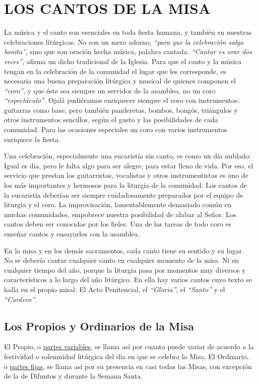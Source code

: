 \documentclass[letterpaper, 12pt]{book}
\begin{document}
    \chapter{LOS CANTOS DE LA MISA}
    La m\'usica y el canto son esenciales en toda fiesta humana, y tambi\'en en nuestras celebraciones lit\'urgicas. No son un mero adorno, \textit{``para que la celebraci\'on salga bonita''}, sino que son oraci\'on hecha m\'usica, palabra cantada. \textit{``Cantar es orar dos veces''}, afirma un dicho tradicional de la Iglesia. Para que el canto y la m\'usica tengan en la celebraci\'on de la comunidad el lugar que les corresponde, es necesaria una buena preparación lit\'urgica y musical de quienes componen el \textit{``coro''}, y que \'este sea siempre un servidor de la asamblea, no un coro \textit{``espect\'aculo''}. Ojal\'a pudi\'eramos enriquecer siempre el coro con instrumentos: guitarras como base, pero tambi\'en panderetas, bombos, bong\'os, tri\'angulos y otros instrumentos sencillos, seg\'un el gusto y las posibilidades de cada comunidad. Para las ocasiones especiales un coro con varios instrumentos enriquece la fiesta.\newline
    
    Una celebraci\'on, especialmente una eucarist\'ia sin canto, es como un d\'ia nublado: Igual es d\'ia, pero le falta algo para ser alegre, para estar lleno de vida. Por eso, el servicio que prestan los guitarristas, vocalistas y otros instrumentistas es uno de los m\'as importantes y hermosos para la liturgia de la comunidad. Los cantos de la eucarist\'ia deber\'ian ser siempre cuidadosamente preparados por el equipo de liturgia y el coro. La improvisaci\'on, lamentablemente demasiado com\'un en muchas comunidades, empobrece nuestra posibilidad de alabar al Se\~nor. Los cantos deben ser conocidos por los fieles. Una de las tareas de todo coro es ense\~nar cantos y ensayarlos con la asamblea.\newline
    
    En la misa y en los dem\'as sacramentos, cada canto tiene su sentido y su lugar. No se deber\'ia cantar cualquier canto en cualquier momento de la misa. Ni en cualquier tiempo del a\~no, porque la liturgia pasa por momentos muy diversos y caracter\'isticos a lo largo del año lit\'urgico. En ella hay varios cantos cuyo texto se halla en el propio misal: El Acto Penitencial, el \textit{``Gloria''}, el \textit{``Santo''} y el \textit{``Cordero''}.
    
    \section{Los Propios y Ordinarios de la Misa}
    El Propio, o \underline{partes variables}, se llama as\'i por cuanto puede variar de acuerdo a la festividad o solemnidad lit\'urgica del d\'ia en que se celebra la Misa. El Ordinario, o \underline{partes fijas}, se llama as\'i por su presencia en casi todas las Misas, con excepci\'on de la de Difuntos y durante la Semana Santa.\newline
    
\end{document}
